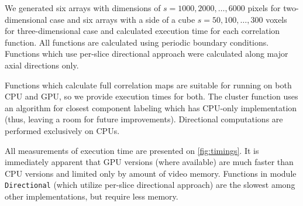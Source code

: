 \documentclass[1p]{elsarticle}
\newcommand{\code}[1]{\colorbox{light-gray}{\texttt{#1}}}
\begin{document}
We generated six arrays with dimensions of $s = 1000, 2000, \dots, 6000$ pixels
for two-dimensional case and six arrays with a side of a cube $s = 50, 100,
\dots, 300$ voxels for three-dimensional case and calculated execution time for
each correlation function. All functions are calculated using periodic boundary
conditions. Functions which use per-slice directional approach were calculated
along major axial directions only.

Functions which calculate full correlation maps are suitable for running on both
CPU and GPU, so we provide execution times for both. The cluster function uses
an algorithm for closest component labeling which has CPU-only implementation
(thus, leaving a room for future improvements). Directional computations are
performed exclusively on CPUs.

All measurements of execution time are presented on \cref{fig:timings}. It is
immediately apparent that GPU versions (where available) are much faster than
CPU versions and limited only by amount of video memory. Functions in module
\code{Directional} (which utilize per-slice directional approach) are the
slowest among other implementations, but require less memory.
\end{document}
